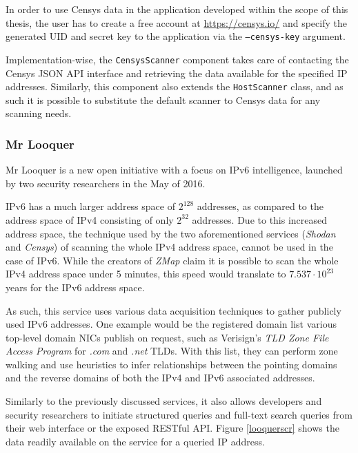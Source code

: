 \documentclass[a4paper,12pt]{article}
\begin{document}
	In order to use Censys data in the application developed within the scope of this thesis, the user has to create a free account at \url{https://censys.io/} and specify the generated UID and secret key to the application via the \texttt{--censys-key} argument.
		
	Implementation-wise, the \texttt{CensysScanner} component takes care of contacting the Censys JSON API interface and retrieving the data available for the specified IP addresses. Similarly, this component also extends the \texttt{HostScanner} class, and as such it is possible to substitute the default scanner to Censys data for any scanning needs.
	
\subsubsection{Mr Looquer} \label{looquer}
 

	Mr Looquer\cite{looquer16} is a new open initiative with a focus on IPv6 intelligence, launched by two security researchers in the May of 2016.
	
	IPv6 has a much larger address space of $ 2^{128} $ addresses, as compared to the address space of IPv4 consisting of only $ 2^{32} $ addresses. Due to this increased address space, the technique used by the two aforementioned services (\textit{Shodan} and \textit{Censys}) of scanning the whole IPv4 address space, cannot be used in the case of IPv6. While the creators of \textit{ZMap} claim it is possible to scan the whole IPv4 address space under 5 minutes\cite{zmap13}, this speed would translate to $ 7.537 \cdot 10^{23} $ years for the IPv6 address space.
	
	As such, this service uses various data acquisition techniques to gather publicly used IPv6 addresses. One example would be the registered domain list various top-level domain NICs publish on request, such as Verisign's \textit{TLD Zone File Access Program}\cite{verisign16} for \textit{.com} and \textit{.net} TLDs. With this list, they can perform zone walking and use heuristics to infer relationships between the pointing domains and the reverse domains of both the IPv4 and IPv6 associated addresses.
	
	Similarly to the previously discussed services, it also allows developers and security researchers to initiate structured queries and full-text search queries from their web interface or the exposed RESTful API. Figure \ref{looquerscr} shows the data readily available on the service for a queried IP address.
	
\end{document}
